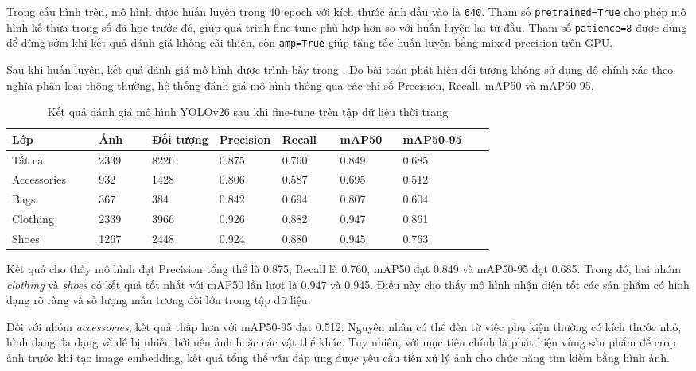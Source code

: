 Trong cấu hình trên, mô hình được huấn luyện trong 40 epoch với kích thước ảnh đầu vào là \texttt{640}. Tham số \texttt{pretrained=True} cho phép mô hình kế thừa trọng số đã học trước đó, giúp quá trình fine-tune phù hợp hơn so với huấn luyện lại từ đầu. Tham số \texttt{patience=8} được dùng để dừng sớm khi kết quả đánh giá không cải thiện, còn \texttt{amp=True} giúp tăng tốc huấn luyện bằng mixed precision trên GPU.

Sau khi huấn luyện, kết quả đánh giá mô hình được trình bày trong . Do bài toán phát hiện đối tượng không sử dụng độ chính xác theo nghĩa phân loại thông thường, hệ thống đánh giá mô hình thông qua các chỉ số Precision, Recall, mAP50 và mAP50-95.

\begin{table}[H]
\centering
\caption{Kết quả đánh giá mô hình YOLOv26 sau khi fine-tune trên tập dữ liệu thời trang}
\label{tab:yolov26-finetune-result}
\begin{tabularx}{\linewidth}{@{}p{0.18\linewidth}p{0.11\linewidth}p{0.14\linewidth}p{0.13\linewidth}p{0.12\linewidth}p{0.13\linewidth}X@{}}
\toprule
\textbf{Lớp} & \textbf{Ảnh} & \textbf{Đối tượng} & \textbf{Precision} & \textbf{Recall} & \textbf{mAP50} & \textbf{mAP50-95} \\
\midrule
Tất cả & 2339 & 8226 & 0.875 & 0.760 & 0.849 & 0.685 \\
Accessories & 932 & 1428 & 0.806 & 0.587 & 0.695 & 0.512 \\
Bags & 367 & 384 & 0.842 & 0.694 & 0.807 & 0.604 \\
Clothing & 2339 & 3966 & 0.926 & 0.882 & 0.947 & 0.861 \\
Shoes & 1267 & 2448 & 0.924 & 0.880 & 0.945 & 0.763 \\
\bottomrule
\end{tabularx}
\end{table}

Kết quả cho thấy mô hình đạt Precision tổng thể là 0.875, Recall là 0.760, mAP50 đạt 0.849 và mAP50-95 đạt 0.685. Trong đó, hai nhóm \textit{clothing} và \textit{shoes} có kết quả tốt nhất với mAP50 lần lượt là 0.947 và 0.945. Điều này cho thấy mô hình nhận diện tốt các sản phẩm có hình dạng rõ ràng và số lượng mẫu tương đối lớn trong tập dữ liệu.

Đối với nhóm \textit{accessories}, kết quả thấp hơn với mAP50-95 đạt 0.512. Nguyên nhân có thể đến từ việc phụ kiện thường có kích thước nhỏ, hình dạng đa dạng và dễ bị nhiễu bởi nền ảnh hoặc các vật thể khác. Tuy nhiên, với mục tiêu chính là phát hiện vùng sản phẩm để crop ảnh trước khi tạo image embedding, kết quả tổng thể vẫn đáp ứng được yêu cầu tiền xử lý ảnh cho chức năng tìm kiếm bằng hình ảnh.

